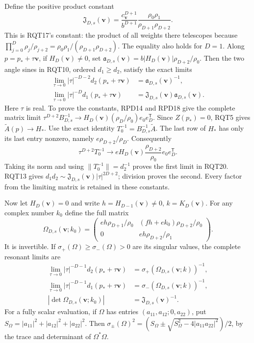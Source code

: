 Define the positive product constant
\[
 \mathfrak J_{D,s}(\mathbf v)
 =\frac{c_{\mathbf v}^{D+1}}{b^{D+1}}
       \frac{\rho_0\rho_1}{\rho_{D+1}\rho_{D+2}}.
\]
This is RQT17's constant: the product of all weights there telescopes
because
$\prod_{j=0}^D\rho_j/\rho_{j+2}
 =\rho_0\rho_1/(\rho_{D+1}\rho_{D+2})$.
The equality also holds for $D=1$.
Along $p=p_*+\tau\mathbf v$, if $H_D(\mathbf v)\ne0$, set
$\mathfrak a_{D,s}(\mathbf v)=
b|H_D(\mathbf v)|\rho_{D+2}/\rho_0$.
Then the two angle sines in RQT10, ordered $d_1\ge d_2$, satisfy
the exact limits
\[
 \begin{aligned}
 \lim_{\tau\to0}|\tau|^{-D-2}d_2(p_*+\tau\mathbf v)
   &=\mathfrak a_{D,s}(\mathbf v)^{-1},\\
 \lim_{\tau\to0}|\tau|^{-D}d_1(p_*+\tau\mathbf v)
   &=\mathfrak J_{D,s}(\mathbf v)\mathfrak a_{D,s}(\mathbf v).
 \end{aligned}\tag{RQT20}
\]
Here $\tau$ is real.  To prove the constants, RPD14 and RPD18 give
the complete matrix limit
$\tau^{D+2}B_{D,s}^{-1}\to
H_D(\mathbf v)(\rho_D/\rho_0)e_0e_D^{\mathsf T}$.
Since $Z(p_*)=0$, RQT5 gives
$\widetilde A(p)\to H_*$.
Use the exact identity $T_0^{-1}=B_{D,s}^{-1}\widetilde A$.
The last row of $H_*$ has only its last entry nonzero, namely
$e\rho_{D+2}/\rho_D$.  Consequently
\[
 \tau^{D+2}T_0^{-1}\longrightarrow
 eH_D(\mathbf v)\frac{\rho_{D+2}}{\rho_0}
                           e_0e_D^{\mathsf T}.
\]
Taking its norm and using $\|T_0^{-1}\|=d_2^{-1}$ proves the
first limit in RQT20.  RQT13 gives
$d_1d_2\sim\mathfrak J_{D,s}(\mathbf v)|\tau|^{2D+2}$;
division proves the second.  Every factor from the limiting matrix
is retained in these constants.

Now let $H_D(\mathbf v)=0$ and write
$h=H_{D-1}(\mathbf v)\ne0$, $k=K_D(\mathbf v)$.
For any complex number $k_0$ define the full matrix
\[
 \Omega_{D,s}(\mathbf v;k_0)=
 \begin{pmatrix}
  eh\rho_{D+1}/\rho_0&(fh+ek_0)\rho_{D+2}/\rho_0\\
  0&eh\rho_{D+2}/\rho_1
 \end{pmatrix}.
\]
It is invertible.  If $\sigma_+(\Omega)\ge\sigma_-(\Omega)>0$
are its singular values, the complete resonant limits are
\[
 \begin{aligned}
 \lim_{\tau\to0}|\tau|^{-D-1}d_2(p_*+\tau\mathbf v)
   &=\sigma_+(\Omega_{D,s}(\mathbf v;k))^{-1},\\
 \lim_{\tau\to0}|\tau|^{-D-1}d_1(p_*+\tau\mathbf v)
   &=\sigma_-(\Omega_{D,s}(\mathbf v;k))^{-1},\\
 |\det\Omega_{D,s}(\mathbf v;k_0)|
   &=\mathfrak J_{D,s}(\mathbf v)^{-1}.
 \end{aligned}\tag{RQT21}
\]
For a fully scalar evaluation, if $\Omega$ has entries
$(a_{11},a_{12};0,a_{22})$, put
$S_\Omega=|a_{11}|^2+|a_{12}|^2+|a_{22}|^2$.
Then
$\sigma_\pm(\Omega)^2=
(S_\Omega\pm\sqrt{S_\Omega^2-4|a_{11}a_{22}|^2})/2$,
by the trace and determinant of $\Omega^*\Omega$.

